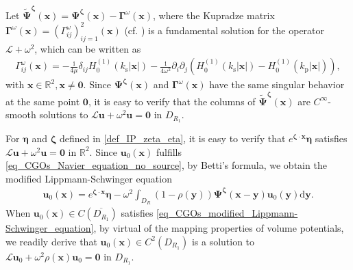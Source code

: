 \documentclass[11pt,reqno,oneside]{amsart}
\theoremstyle{definition}
\theoremstyle{remark}
\numberwithin{equation}{section}
\numberwithin{equation}{section}
\theoremstyle{remark}
\begin{document}
Let $ \tilde{\bm{\Psi}}^{\bm{\zeta}}\left(\mathbf{x}\right) = \bm{\Psi}^{\bm{\zeta}}\left(\mathbf{x}\right) - \bm{\Gamma}^\omega\left(\mathbf{x}\right) $, where the Kupradze matrix $ \bm{\Gamma}^{\omega}\left(\mathbf{x}\right) =  \left(\Gamma_{i j}^{\omega}\right)_{ij=1}^2\left(\mathbf{x}\right)  $ (cf. \cite{ammari2015mathematical}) is a fundamental solution for the operator $ \mathcal{L}+\omega^2 $, which can be written as
\begin{align*}
	\Gamma_{i j}^{\omega} \left(\mathbf{x}\right) = -\frac{\mathrm{i}}{4\mu} \delta_{ij} H_0^{\left(1\right)} \left(k_{\mathrm{s}}\left|\mathbf{x}\right|\right) - \frac{\mathrm{i}}{4\omega^2} \partial_i \partial_j \left( H_0^{\left(1\right)} \left(k_{\mathrm{s}}\left|\mathbf{x}\right|\right) - H_0^{\left(1\right)} \left(k_{\mathrm{p}}\left|\mathbf{x}\right|\right) \right),
\end{align*}
with $ \mathbf{x}\in\mathbb{R}^2, \mathbf{x}\neq\mathbf{0} $. Since $ \bm{\Psi}^{\bm{\zeta}}\left(\mathbf{x}\right) $ and $ \bm{\Gamma}^\omega\left(\mathbf{x}\right) $ have the same singular behavior at the same point $ \mathbf{0} $, it is easy to verify that the columns of $ \tilde{\bm{\Psi}}^{\bm{\zeta}}\left(\mathbf{x}\right) $ are $ C^{\infty} $-smooth solutions to $ \mathcal{L} \mathbf{u} + \omega^2 \mathbf{u} = \bm{0} $ in $ D_{R_1} $.


For $ \bm{\eta} $ and $ \bm{\zeta} $ defined in \eqref{def_IP_zeta_eta}, it is easy to verify that $ e^{\bm{\zeta} \cdot \mathbf{x}} \bm{\eta}  $ satisfies $ \mathcal{L} \mathbf{u} + \omega^2 \mathbf{u} = \bm{0} $ in $ \mathbb{R}^2 $. Since $ \mathbf{u}_0\left(\mathbf{x}\right) $ fulfills \eqref{eq_CGOs_Navier_equation_no_source}, by Betti's formula, we obtain the modified Lippmann-Schwinger equation
\begin{align} \label{eq_CGOs_modified_Lippmann-Schwinger_equation}
	\mathbf{u}_0\left(\mathbf{x}\right) = e^{\bm{\zeta}\cdot\mathbf{x}} \bm{\eta} - \omega^2 \int_{D_R} \left(1-\rho\left(\mathbf{y}\right)\right) \bm{\Psi}^{\bm{\zeta}}\left(\mathbf{x}-\mathbf{y}\right) \mathbf{u}_0\left(\mathbf{y}\right) \mathrm{d} \mathbf{y}.
\end{align}
When $ \mathbf{u}_0\left(\mathbf{x}\right) \in C \left(\overline{D_{R_1}}\right) $ satisfies \eqref{eq_CGOs_modified_Lippmann-Schwinger_equation}, by virtual of the mapping properties of volume potentials, we readily derive that $ \mathbf{u}_0\left(\mathbf{x}\right) \in C^2\left(D_{R_1}\right) $ is a solution to $ \mathcal{L}\mathbf{u}_0 + \omega^2 \rho\left(\mathbf{x}\right) \mathbf{u}_0 = \bm{0} $ in $ D_{R_1} $.
\end{document}
